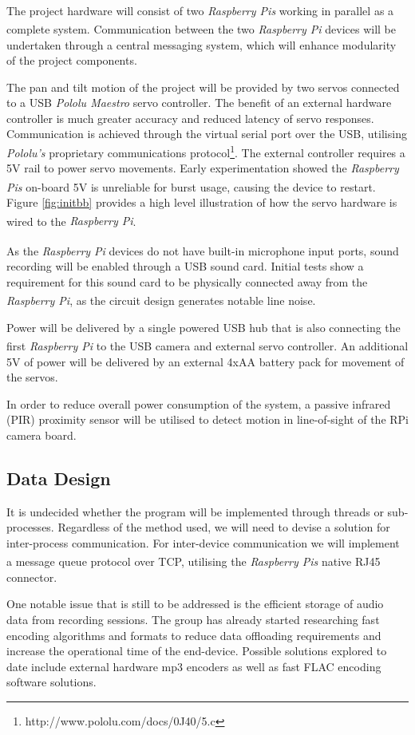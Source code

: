 \documentclass[11pt,a4paper,titlepage]{report}
\newcommand{\rpi}{\textit{Raspberry Pi\textsuperscript{\textregistered}}}
\newcommand{\rpis}{\textit{Raspberry Pi\textsuperscript{\textregistered}s}}
\begin{document}
The project hardware will consist of two \rpis\xspace working in parallel as a complete system. Communication between the two \rpi\xspace devices will be undertaken through a central messaging system, which will enhance modularity of the project components.

The pan and tilt motion of the project will be provided by two servos connected to a USB \textit{Pololu Maestro} servo controller. The benefit of an external hardware controller is much greater accuracy and reduced latency of servo responses. Communication is achieved through the virtual serial port over the USB, utilising \textit{Pololu's} proprietary communications protocol\footnote{http://www.pololu.com/docs/0J40/5.c}. The external controller requires a 5V rail to power servo movements. Early experimentation showed the \rpis\xspace on-board 5V is unreliable for burst usage, causing the device to restart. Figure \ref{fig:initbb} provides a high level illustration of how the servo hardware is wired to the \rpi.


As the \rpi\xspace devices do not have built-in microphone input ports, sound recording will be enabled through a USB sound card. Initial tests show a requirement for this sound card to be physically connected away from the \rpi, as the circuit design generates notable line noise.

Power will be delivered by a single powered USB hub that is also connecting the first \rpi\xspace to the USB camera and external servo controller. An additional 5V of power will be delivered by an external 4xAA battery pack for movement of the servos.

In order to reduce overall power consumption of the system, a passive infrared (PIR) proximity sensor will be utilised to detect motion in line-of-sight of the RPi camera board. 

\subsection{Data Design}

It is undecided whether the program will be implemented through threads or sub-processes. Regardless of the method used, we will need to devise a solution for inter-process communication. For inter-device communication we will implement a message queue protocol over TCP, utilising the \rpis\xspace native RJ45 connector.

One notable issue that is still to be addressed is the efficient storage of audio data from recording sessions. The group has already started researching fast encoding algorithms and formats to reduce data offloading requirements and increase the operational time of the end-device. Possible solutions explored to date include external hardware mp3 encoders as well as fast FLAC encoding software solutions.
\end{document}
